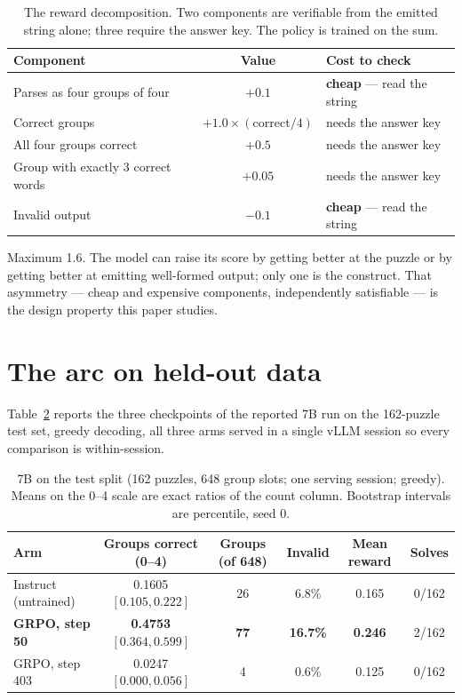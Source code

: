 \documentclass{article}
\begin{document}
\begin{table}[h]
\centering
\caption{The reward decomposition. Two components are verifiable from the
emitted string alone; three require the answer key. The policy is trained on
the sum.}
\label{tab:reward}
\begin{tabular}{lcl}
\toprule
Component & Value & Cost to check \\
\midrule
Parses as four groups of four & $+0.1$ & \textbf{cheap} --- read the string \\
Correct groups & $+1.0 \times (\text{correct}/4)$ & needs the answer key \\
All four groups correct & $+0.5$ & needs the answer key \\
Group with exactly 3 correct words & $+0.05$ & needs the answer key \\
Invalid output & $-0.1$ & \textbf{cheap} --- read the string \\
\bottomrule
\end{tabular}
\end{table}

Maximum 1.6. The model can raise its score by getting better at the puzzle
or by getting better at emitting well-formed output; only one is the
construct. That asymmetry --- cheap and expensive components, independently
satisfiable --- is the design property this paper studies.

\section{The arc on held-out data}
\label{sec:arc}

Table~\ref{tab:arc} reports the three checkpoints of the reported 7B run on
the 162-puzzle test set, greedy decoding, all three arms served in a single
vLLM session so every comparison is within-session.

\begin{table}[h]
\centering
\caption{7B on the test split (162 puzzles, 648 group slots; one serving
session; greedy). Means on the 0--4 scale are exact ratios of the count
column. Bootstrap intervals are percentile, seed 0.}
\label{tab:arc}
\small
\setlength{\tabcolsep}{4pt}
\begin{tabular}{lccccc}
\toprule
Arm & Groups correct (0--4) & Groups (of 648) & Invalid & Mean reward & Solves \\
\midrule
Instruct (untrained) & 0.1605 $[0.105, 0.222]$ & 26 & 6.8\%  & 0.165 & 0/162 \\
\textbf{GRPO, step 50}  & \textbf{0.4753} $[0.364, 0.599]$ & \textbf{77} & \textbf{16.7\%} & \textbf{0.246} & 2/162 \\
GRPO, step 403     & 0.0247 $[0.000, 0.056]$ & 4 & 0.6\%  & 0.125 & 0/162 \\
\bottomrule
\end{tabular}
\end{table}
\end{document}
